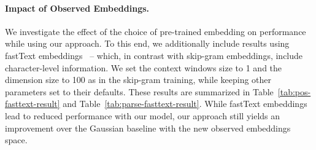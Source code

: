 \documentclass[11pt,a4paper]{article}
\begin{document}
\paragraph{Impact of Observed Embeddings. }
\begin{table}[!t]
    \centering
    \caption{Unsupervised POS tagging results on WSJ, with fastText vectors as the observed embeddings.}
    \label{tab:pos-fasttext-result}
\end{table}

\begin{table}[!t]
    \centering
    \caption{Directed dependency accuracy on section 23 of WSJ, with fastText vectors as the observed embeddings.}
    \label{tab:parse-fasttext-result}
    \vspace{-5mm}
\end{table}
We investigate the effect of the choice of pre-trained embedding on performance while using our approach. To this end, we additionally include results using fastText embeddings~\citep{bojanowski2017enriching} -- which, in contrast with skip-gram embeddings, include character-level information. We set the context windows size to 1 and the dimension size to 100 as in the skip-gram training, while keeping other parameters set to their defaults. These results are summarized in Table~\ref{tab:pos-fasttext-result} and Table~\ref{tab:parse-fasttext-result}. While fastText embeddings lead to reduced performance with our model, our approach still yields an improvement over the Gaussian baseline with the new observed embeddings space.
\end{document}
